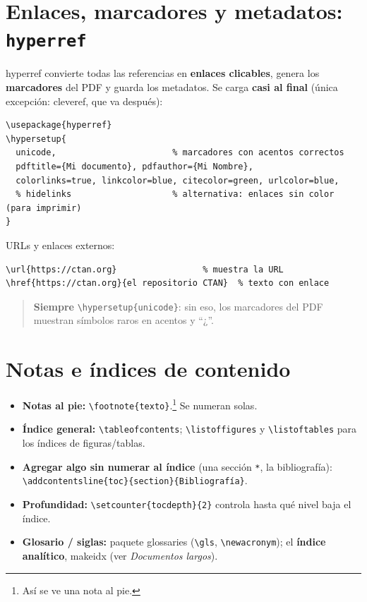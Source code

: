 \documentclass[11pt,a4paper]{article}
\newcommand{\C}[1]{\texttt{\textbackslash #1}}
\newcommand{\pkg}[1]{\textsf{#1}}
\begin{document}
\section{Enlaces, marcadores y metadatos: \texttt{hyperref}}
\pkg{hyperref} convierte todas las referencias en \textbf{enlaces clicables},
genera los \textbf{marcadores} del PDF y guarda los metadatos. Se carga
\textbf{casi al final} (única excepción: \pkg{cleveref}, que va después):
\begin{lstlisting}
\usepackage{hyperref}
\hypersetup{
  unicode,                       % marcadores con acentos correctos
  pdftitle={Mi documento}, pdfauthor={Mi Nombre},
  colorlinks=true, linkcolor=blue, citecolor=green, urlcolor=blue,
  % hidelinks                    % alternativa: enlaces sin color (para imprimir)
}
\end{lstlisting}
URLs y enlaces externos:
\begin{lstlisting}
\url{https://ctan.org}                 % muestra la URL
\href{https://ctan.org}{el repositorio CTAN}  % texto con enlace
\end{lstlisting}
\begin{quote}\small
\textbf{Siempre} \C{hypersetup\{unicode\}}: sin eso, los marcadores del PDF
muestran símbolos raros en acentos y \enquote{¿}.
\end{quote}

\section{Notas e índices de contenido}
\begin{itemize}[leftmargin=*]
  \item \textbf{Notas al pie:} \C{footnote\{texto\}}.\footnote{Así se ve una nota
        al pie.} Se numeran solas.
  \item \textbf{Índice general:} \C{tableofcontents}; \C{listoffigures} y
        \C{listoftables} para los índices de figuras/tablas.
  \item \textbf{Agregar algo sin numerar al índice} (una sección \texttt{*}, la
        bibliografía): \C{addcontentsline\{toc\}\{section\}\{Bibliografía\}}.
  \item \textbf{Profundidad:} \C{setcounter\{tocdepth\}\{2\}} controla hasta qué
        nivel baja el índice.
  \item \textbf{Glosario / siglas:} paquete \pkg{glossaries} (\C{gls},
        \C{newacronym}); el \textbf{índice analítico}, \pkg{makeidx} (ver
        \emph{Documentos largos}).
\end{itemize}
\end{document}

